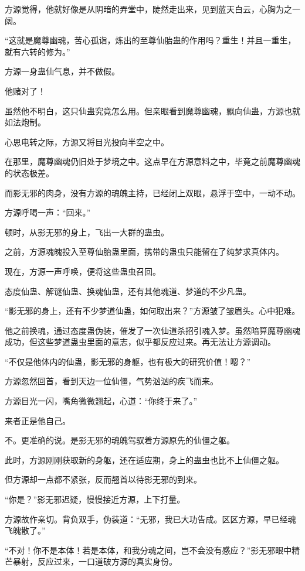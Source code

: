 \begin{this_body}
方源觉得，他就好像是从阴暗的弄堂中，陡然走出来，见到蓝天白云，心胸为之一阔。

“这就是魔尊幽魂，苦心孤诣，炼出的至尊仙胎蛊的作用吗？重生！并且一重生，就有六转的修为。”

方源一身蛊仙气息，并不做假。

他赌对了！

虽然他不明白，这只仙蛊究竟怎么用。但亲眼看到魔尊幽魂，飘向仙蛊，方源也就如法炮制。

心思电转之际，方源又将目光投向半空之中。

在那里，魔尊幽魂仍旧处于梦境之中。这点早在方源意料之中，毕竟之前魔尊幽魂的状态极差。

而影无邪的肉身，没有方源的魂魄主持，已经闭上双眼，悬浮于空中，一动不动。

方源呼喝一声：“回来。”

顿时，从影无邪的身上，飞出一大群的蛊虫。

之前，方源魂魄投入至尊仙胎蛊里面，携带的蛊虫只能留在了纯梦求真体内。

现在，方源一声呼唤，便将这些蛊虫召回。

态度仙蛊、解谜仙蛊、换魂仙蛊，还有其他魂道、梦道的不少凡蛊。

“影无邪的身上，还有不少梦道仙蛊，如何取出来？”方源皱了皱眉头。心中犯难。

他之前换魂，通过态度蛊伪装，催发了一次仙道杀招引魂入梦。虽然暗算魔尊幽魂成功，但这些梦道蛊虫里面的意志，似乎都反应过来。再无法让方源调动。

“不仅是他体内的仙蛊，影无邪的身躯，也有极大的研究价值！嗯？”

方源忽然回首，看到天边一位仙僵，气势汹汹的疾飞而来。

方源目光一闪，嘴角微微翘起，心道：“你终于来了。”

来者正是他自己。

不。更准确的说。是影无邪的魂魄驾驭着方源原先的仙僵之躯。

此时，方源刚刚获取新的身躯，还在适应期，身上的蛊虫也比不上仙僵之躯。

但方源却一点都不紧张，反而翘首以待影无邪的到来。

“你是？”影无邪迟疑，慢慢接近方源，上下打量。

方源故作亲切。背负双手，伪装道：“无邪，我已大功告成。区区方源，早已经魂飞魄散了。”

“不对！你不是本体！若是本体，和我分魂之间，岂不会没有感应？”影无邪眼中精芒暴射，反应过来，一口道破方源的真实身份。


\end{this_body}
